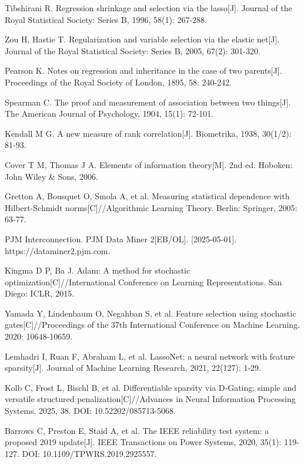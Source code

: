 Tibshirani R. Regression shrinkage and selection via the lasso[J]. Journal of the Royal Statistical Society: Series B, 1996, 58(1): 267-288.

Zou H, Hastie T. Regularization and variable selection via the elastic net[J]. Journal of the Royal Statistical Society: Series B, 2005, 67(2): 301-320.

Pearson K. Notes on regression and inheritance in the case of two parents[J]. Proceedings of the Royal Society of London, 1895, 58: 240-242.

Spearman C. The proof and measurement of association between two things[J]. The American Journal of Psychology, 1904, 15(1): 72-101.

Kendall M G. A new measure of rank correlation[J]. Biometrika, 1938, 30(1/2): 81-93.

Cover T M, Thomas J A. Elements of information theory[M]. 2nd ed. Hoboken: John Wiley \& Sons, 2006.

Gretton A, Bousquet O, Smola A, et al. Measuring statistical dependence with Hilbert-Schmidt norms[C]//Algorithmic Learning Theory. Berlin: Springer, 2005: 63-77.

PJM Interconnection. PJM Data Miner 2[EB/OL]. [2025-05-01]. https://dataminer2.pjm.com.

Kingma D P, Ba J. Adam: A method for stochastic optimization[C]//International Conference on Learning Representations. San Diego: ICLR, 2015.

Yamada Y, Lindenbaum O, Negahban S, et al. Feature selection using stochastic gates[C]//Proceedings of the 37th International Conference on Machine Learning. 2020: 10648-10659.

Lemhadri I, Ruan F, Abraham L, et al. LassoNet: a neural network with feature sparsity[J]. Journal of Machine Learning Research, 2021, 22(127): 1-29.

Kolb C, Frost L, Bischl B, et al. Differentiable sparsity via D-Gating: simple and versatile structured penalization[C]//Advances in Neural Information Processing Systems. 2025, 38. DOI: 10.52202/085713-5068.

Barrows C, Preston E, Staid A, et al. The IEEE reliability test system: a proposed 2019 update[J]. IEEE Transactions on Power Systems, 2020, 35(1): 119-127. DOI: 10.1109/TPWRS.2019.2925557.
